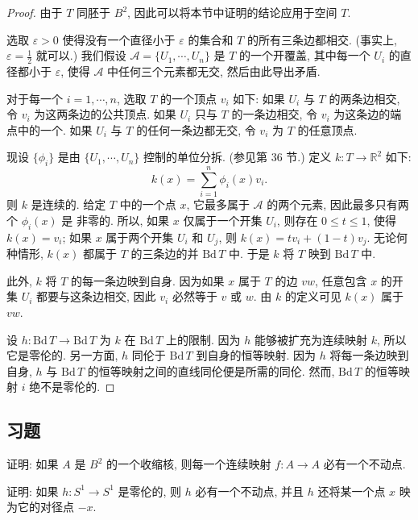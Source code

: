 \begin{proof}
由于 $T$ 同胚于 $B^{2}$, 因此可以将本节中证明的结论应用于空间 $T$.

选取 $\varepsilon>0$ 使得没有一个直径小于 $\varepsilon$ 的集合和 $T$ 的所有三条边都相交. (事实上, $\varepsilon=\frac{1}{2}$ 就可以.) 我们假设 $\mathcal{A}=\{U_1,\cdots,U_n\}$ 是 $T$ 的一个开覆盖, 其中每一个 $U_i$ 的直径都小于 $\varepsilon$, 使得 $\mathcal{A}$ 中任何三个元素都无交, 然后由此导出矛盾.

对于每一个 $i=1,\cdots,n$, 选取 $T$ 的一个顶点 $v_i$ 如下: 如果 $U_i$ 与 $T$ 的两条边相交, 令 $v_i$ 为这两条边的公共顶点. 如果 $U_i$ 只与 $T$ 的一条边相交, 令 $v_i$ 为这条边的端点中的一个. 如果 $U_i$ 与 $T$ 的任何一条边都无交, 令 $v_i$ 为 $T$ 的任意顶点.

现设 $\{\phi_i\}$ 是由 $\{U_1,\cdots,U_n\}$ 控制的单位分拆. (参见第 36 节.) 定义 $k\colon T\to\mathbb{R}^{2}$ 如下:
\[
k(x)=\sum_{i=1}^{n}\phi_{i}(x)v_{i}.
\]
则 $k$ 是连续的. 给定 $T$ 中的一个点 $x$, 它最多属于 $\mathcal{A}$ 的两个元素, 因此最多只有两个 $\phi_i(x)$ 是
非零的. 所以, 如果 $x$ 仅属于一个开集 $U_i$, 则存在 $0\leqslant t\leqslant 1$, 使得 $k(x)=v_i$; 如果 $x$ 属于两个开集 $U_i$ 和 $U_j$, 则 $k(x)=tv_i+(1-t)v_j$. 无论何种情形, $k(x)$ 都属于 $T$ 的三条边的并 $\mathrm{Bd}\,T$ 中. 于是 $k$ 将 $T$ 映到 $\mathrm{Bd}\,T$ 中.

此外, $k$ 将 $T$ 的每一条边映到自身. 因为如果 $x$ 属于 $T$ 的边 $vw$, 任意包含 $x$ 的开集 $U_i$ 都要与这条边相交, 因此 $v_i$ 必然等于 $v$ 或 $w$. 由 $k$ 的定义可见 $k(x)$ 属于 $vw$.

设 $h\colon\mathrm{Bd}\,T\to\mathrm{Bd}\,T$ 为 $k$ 在 $\mathrm{Bd}\,T$ 上的限制. 因为 $h$ 能够被扩充为连续映射 $k$, 所以它是零伦的. 另一方面, $h$ 同伦于 $\mathrm{Bd}\,T$ 到自身的恒等映射. 因为 $h$ 将每一条边映到自身, $h$ 与 $\mathrm{Bd}\,T$ 的恒等映射之间的直线同伦便是所需的同伦. 然而, $\mathrm{Bd}\,T$ 的恒等映射 $i$ 绝不是零伦的.
\end{proof}

\subsection*{习题}

\begin{exercise}
证明: 如果 $A$ 是 $B^{2}$ 的一个收缩核, 则每一个连续映射 $f\colon A\to A$ 必有一个不动点.
\end{exercise}

\begin{exercise}
证明: 如果 $h\colon S^{1}\to S^{1}$ 是零伦的, 则 $h$ 必有一个不动点, 并且 $h$ 还将某一个点 $x$ 映为它的对径点 $-x$.
\end{exercise}

